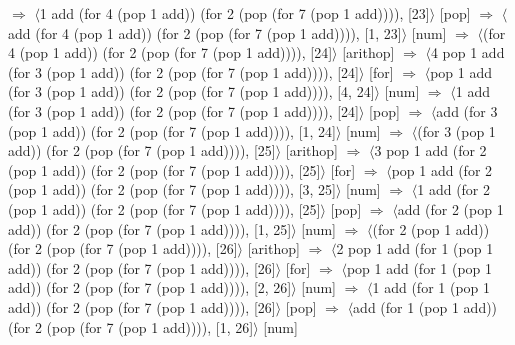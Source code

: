 \documentclass[12pt]{report}
\begin{document}
$\Rightarrow$ $\langle$1 add (for 4 (pop 1 add)) (for 2 (pop (for 7 (pop 1 add)))), [23]$\rangle$ \hfill [pop] \newline
$\Rightarrow$ $\langle$add (for 4 (pop 1 add)) (for 2 (pop (for 7 (pop 1 add)))), [1, 23]$\rangle$ \hfill [num] \newline
$\Rightarrow$ $\langle$(for 4 (pop 1 add)) (for 2 (pop (for 7 (pop 1 add)))), [24]$\rangle$ \hfill [arithop] \newline
$\Rightarrow$ $\langle$4 pop 1 add (for 3 (pop 1 add)) (for 2 (pop (for 7 (pop 1 add)))), [24]$\rangle$ \hfill [for] \newline
$\Rightarrow$ $\langle$pop 1 add (for 3 (pop 1 add)) (for 2 (pop (for 7 (pop 1 add)))), [4, 24]$\rangle$ \hfill [num] \newline
$\Rightarrow$ $\langle$1 add (for 3 (pop 1 add)) (for 2 (pop (for 7 (pop 1 add)))), [24]$\rangle$ \hfill [pop] \newline
$\Rightarrow$ $\langle$add (for 3 (pop 1 add)) (for 2 (pop (for 7 (pop 1 add)))), [1, 24]$\rangle$ \hfill [num] \newline
$\Rightarrow$ $\langle$(for 3 (pop 1 add)) (for 2 (pop (for 7 (pop 1 add)))), [25]$\rangle$ \hfill [arithop] \newline
$\Rightarrow$ $\langle$3 pop 1 add (for 2 (pop 1 add)) (for 2 (pop (for 7 (pop 1 add)))), [25]$\rangle$ \hfill [for] \newline
$\Rightarrow$ $\langle$pop 1 add (for 2 (pop 1 add)) (for 2 (pop (for 7 (pop 1 add)))), [3, 25]$\rangle$ \hfill [num] \newline
$\Rightarrow$ $\langle$1 add (for 2 (pop 1 add)) (for 2 (pop (for 7 (pop 1 add)))), [25]$\rangle$ \hfill [pop] \newline
$\Rightarrow$ $\langle$add (for 2 (pop 1 add)) (for 2 (pop (for 7 (pop 1 add)))), [1, 25]$\rangle$ \hfill [num] \newline
$\Rightarrow$ $\langle$(for 2 (pop 1 add)) (for 2 (pop (for 7 (pop 1 add)))), [26]$\rangle$ \hfill [arithop] \newline
$\Rightarrow$ $\langle$2 pop 1 add (for 1 (pop 1 add)) (for 2 (pop (for 7 (pop 1 add)))), [26]$\rangle$ \hfill [for] \newline
$\Rightarrow$ $\langle$pop 1 add (for 1 (pop 1 add)) (for 2 (pop (for 7 (pop 1 add)))), [2, 26]$\rangle$ \hfill [num] \newline
$\Rightarrow$ $\langle$1 add (for 1 (pop 1 add)) (for 2 (pop (for 7 (pop 1 add)))), [26]$\rangle$ \hfill [pop] \newline
$\Rightarrow$ $\langle$add (for 1 (pop 1 add)) (for 2 (pop (for 7 (pop 1 add)))), [1, 26]$\rangle$ \hfill [num] \newline
\end{document}
